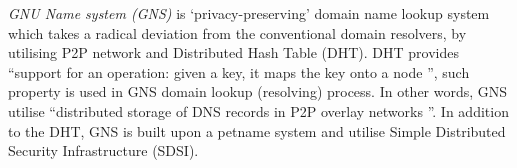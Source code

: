 \textit{GNU Name system (GNS)} is `privacy-preserving' domain name lookup system which takes a radical deviation from the conventional domain resolvers, by utilising P2P network and Distributed Hash Table (DHT).
DHT provides ``support for an operation: given a key, it maps the key onto a node \cite{stoica2001chord}'', such property is used in GNS domain lookup (resolving) process. 
In other words, GNS utilise ``distributed storage of DNS records in P2P overlay networks \cite{wachs2014censorship}''. In addition to the DHT, GNS is built upon a petname system \cite{stiegler2005introduction} and utilise Simple Distributed Security Infrastructure (SDSI).